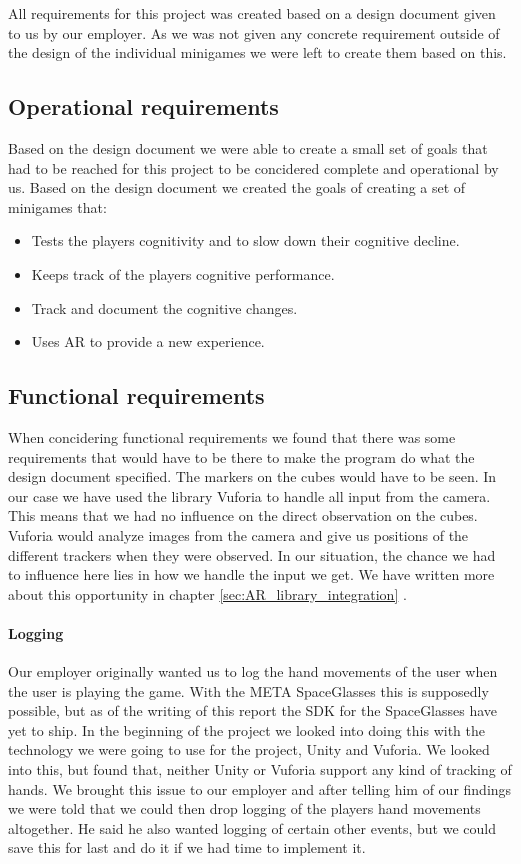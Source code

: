 All requirements for this project was created based on a design document given to us by our employer.
As we was not given any concrete requirement outside of the design of the individual minigames we
were left to create them based on this.


\subsection{Operational requirements}
Based on the design document we were able to create a small set of goals that had to be reached for this project
to be concidered complete and operational by us.
Based on the design document we created the goals of creating a set of minigames that:
\begin{itemize}
	\item Tests the players cognitivity and to slow down their cognitive decline.
	\item Keeps track of the players cognitive performance.
	\item Track and document the cognitive changes.
	\item Uses AR to provide a new experience.
\end{itemize}

\subsection{Functional requirements}
When concidering functional requirements we found that there was some requirements that would have to be there to make the program do what the design document specified. 
The markers on the cubes would have to be seen. 
In our case we have used the library \gls{Vuforia} to handle all input from the camera.
This means that we had no influence on the direct observation on the cubes. 
Vuforia would analyze images from the camera and give us positions of the different trackers when they were observed. 
In our situation, the chance we had to influence here lies in how we handle the input we get. 
We have written more about this opportunity in chapter \ref{sec:AR_library_integration} .

\paragraph{Logging}
Our employer originally wanted us to log the hand movements of the user when the user is playing the game. 
With the META SpaceGlasses this is supposedly possible, but as of the writing of this report the SDK for the SpaceGlasses have yet to ship. 
In the beginning of the project we looked into doing this with the technology we were going to use for the project, Unity and Vuforia. 
We looked into this, but found that, neither Unity or Vuforia support any kind of tracking of hands. 
We brought this issue to our employer and after telling him of our findings we were told that we could then drop logging of the players hand movements altogether. 
He said he also wanted logging of certain other events, but we could save this for last and do it if we had time to implement it.